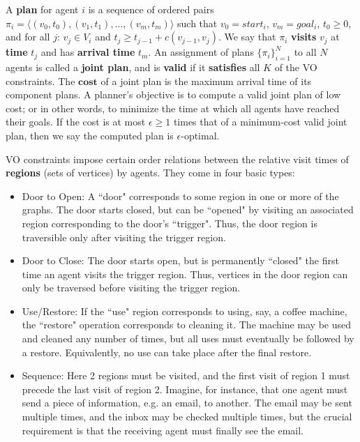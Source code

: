 \documentclass[letterpaper]{article}
\begin{document}
A \textbf{plan} for agent $i$ is a sequence of ordered pairs $\pi_i = \langle (v_0,t_0),(v_1,t_1),\ldots,(v_m,t_m) \rangle$ such that $v_0 = start_i$, $v_m = goal_i$, $t_0 \ge 0$, and for all $j$: $v_j \in V_i$ and $t_{j} \ge t_{j-1} + c(v_{j-1},v_j)$. We say that $\pi_i$ \textbf{visits} $v_j$ at \textbf{time} $t_j$ and has \textbf{arrival time} $t_m$. An assignment of plans $\{\pi_i\}_{i=1}^N$ to all $N$ agents is called a \textbf{joint plan}, and is \textbf{valid} if it \textbf{satisfies} all $K$ of the VO constraints. The $\textbf{cost}$ of a joint plan is the maximum arrival time of its component plans. A planner's objective is to compute a valid joint plan of low cost; or in other words, to minimize the time at which all agents have reached their goals. If the cost is at most $\epsilon \ge 1$ times that of a minimum-cost valid joint plan, then we say the computed plan is $\epsilon$-optimal.

VO constraints impose certain order relations between the relative visit times of \textbf{regions} (sets of vertices) by agents. They come in four basic types:

\begin{itemize}
\item Door to Open: A ``door" corresponds to some region in one or more of the graphs. The door starts closed, but can be ``opened" by visiting an associated region corresponding to the door's ``trigger". Thus, the door region is traversible only after visiting the trigger region.
\item Door to Close: The door starts open, but is permanently ``closed" the first time an agent visits the trigger region. Thus, vertices in the door region can only be traversed before visiting the trigger region.
\item Use/Restore: If the ``use" region corresponds to using, say, a coffee machine, the ``restore" operation corresponds to cleaning it. The machine may be used and cleaned any number of times, but all uses must eventually be followed by a restore. Equivalently, no use can take place after the final restore.
\item Sequence: Here 2 regions must be visited, and the first visit of region 1 must precede the last visit of region 2. Imagine, for instance, that one agent must send a piece of information, e.g. an email, to another. The email may be sent multiple times, and the inbox may be checked multiple times, but the crucial requirement is that the receiving agent must finally see the email.
\end{itemize}
\end{document}

